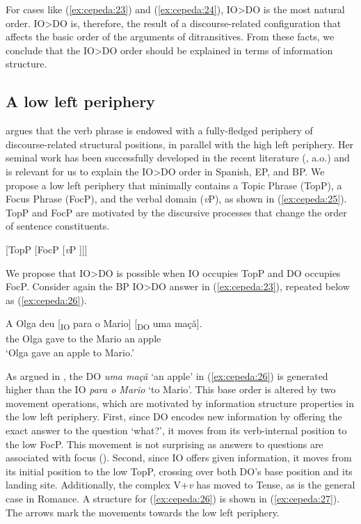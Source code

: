 \documentclass[output=paper,colorlinks,citecolor=brown,modfonts,nonflat]{langsci/langscibook}
\begin{document}
For cases like (\ref{ex:cepeda:23}) and (\ref{ex:cepeda:24}), IO>DO is the most natural order. IO>DO is, therefore, the result of a discourse-related configuration that affects the basic order of the arguments of ditransitives. From these facts, we conclude that the IO>DO order should be explained in terms of information structure.

\subsection{A low left periphery}\label{sec:cepeda:3.2}

\citet{Belletti2004Chapter} argues that the verb phrase is endowed with a fully-fledged periphery of discourse-related structural positions, in parallel with the high left periphery. Her seminal work has been successfully developed in the recent literature (\citealt{Mioto2003, Quarezemin2005, Jiménez-Fernández2009}, a.o.) and is relevant for us to explain the IO>DO order in Spanish, EP, and BP. We propose a low left periphery that minimally contains a Topic Phrase (TopP), a Focus Phrase (FocP), and the verbal domain (\textit{v}P), as shown in (\ref{ex:cepeda:25}). TopP and FocP are motivated by the discursive processes that change the order of sentence constituents.

\ea%
    \label{ex:cepeda:25}{}
	[TopP [FocP [\textit{v}P ]]]
\z

We propose that IO>DO is possible when IO occupies TopP and DO occupies FocP. Consider again the BP IO>DO answer in (\ref{ex:cepeda:23}), repeated below as (\ref{ex:cepeda:26}).

\ea%
    \label{ex:cepeda:26}
	\gll A   Olga deu [\textsubscript{IO} para o   Mario] [\textsubscript{DO} uma maçã].\\
		the Olga gave \hspaceThis{[\textsubscript{IO}} to the Mario  \hspaceThis{[\textsubscript{DO}} an apple\\
	\glt ‘Olga gave an apple to Mario.’
\z

As argued in , the DO \textit{uma maçã} ‘an apple’ in (\ref{ex:cepeda:26}) is generated higher than the IO \textit{para o Mario} ‘to Mario’. This base order is altered by two movement operations, which are motivated by information structure properties in the low left periphery. First, since DO encodes new information by offering the exact answer to the question ‘what?’, it moves from its verb-internal position to the low FocP. This movement is not surprising as answers to questions are associated with focus (\citealt{Rooth1992}). Second, since IO offers given information, it moves from its initial position to the low TopP, crossing over both DO’s base position and its landing site. Additionally, the complex V+\textit{v} has moved to Tense, as is the general case in Romance. A structure for (\ref{ex:cepeda:26}) is shown in (\ref{ex:cepeda:27}). The arrows mark the movements towards the low left periphery.
\end{document}
